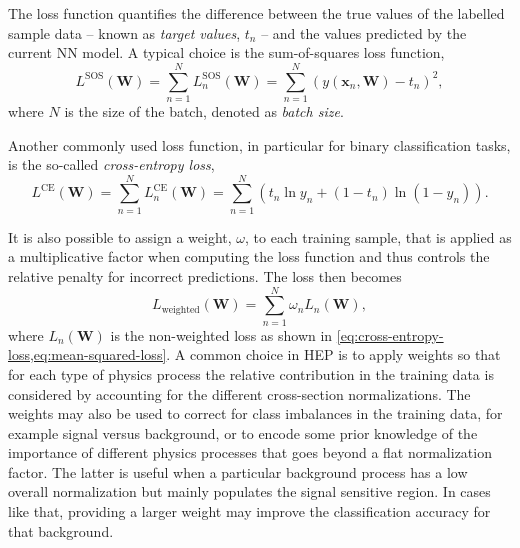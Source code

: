 The loss function quantifies the difference between the true values of the labelled sample data -- known as \emph{target values}, $t_n$ -- and the values predicted by the current NN model. A typical choice is the sum-of-squares loss function,
\begin{equation}
    \label{eq:mean-squared-loss}
   L^{\text{SOS}}(\mathbf{W}) = \sum _{n=1}^{N}L_n^{\text{SOS}}(\mathbf{W})= \sum _{n=1}^{N}\left( y(\mathbf{x}_n, \mathbf{W})-t_n \right)^{2},
\end{equation}
where $N$ is the size of the batch, denoted as \emph{batch size}. 

Another commonly used loss function, in particular for binary classification tasks, is the so-called \emph{cross-entropy loss},
\begin{equation}
    \label{eq:cross-entropy-loss}
    L^{\text{CE}}(\mathbf{W}) = \sum _{n=1}^{N}L_n^{\text{CE}}(\mathbf{W}) = \sum _{n=1}^{N}\left( t_n \ln y_n + ( 1 - t_n) \ln (1 - y_n) \right).
\end{equation}

It is also possible to assign a weight, $\omega$, to each training sample, that is applied as a multiplicative factor when computing the loss function and thus controls the relative penalty for incorrect predictions. The loss then becomes
\begin{equation}
    L_{\text{weighted}}(\mathbf{W}) = \sum _{n=1}^{N} \omega_n L_n(\mathbf{W}), 
\end{equation}
where $L_n(\mathbf{W})$ is the non-weighted loss as shown in \cref{eq:cross-entropy-loss,eq:mean-squared-loss}. 
A common choice in HEP is to apply weights so that for each type of physics process the relative contribution in the training data is considered by accounting for the different cross-section normalizations.
The weights may also be used to correct for class imbalances in the training data, for example signal versus background, or to encode some prior knowledge of the importance of different physics processes that goes beyond a flat normalization factor. The latter is useful when a particular background process has a low overall normalization but mainly populates the signal sensitive region. In cases like that, providing a larger weight may improve the classification accuracy for that background. 


